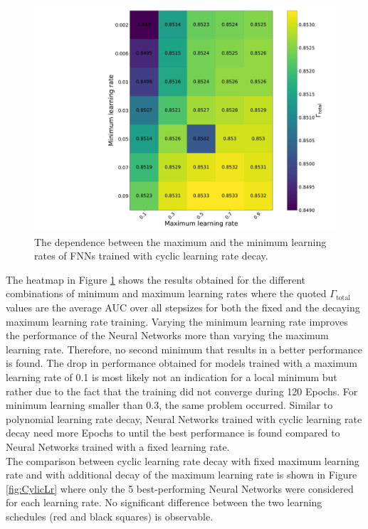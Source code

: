 \begin{figure}[H]
\centering
\includegraphics[width=\linewidth]{figs/FNN/Heat_MinMax}
\caption{The dependence between the maximum and the minimum learning rates of FNNs trained with cyclic learning rate decay.}
\label{fig:CylicHeatLr}
\end{figure}

\vspace{-0.1cm}

The heatmap in Figure \ref{fig:CylicHeatLr} shows the results obtained for the different combinations of minimum and maximum learning rates where the quoted $\Gamma_{\text{total}}$ values are the average AUC over all stepsizes for both the fixed and the decaying maximum learning rate training. Varying the minimum learning rate improves the performance of the Neural Networks more than varying the maximum learning rate. Therefore, no second minimum that results in a better performance is found. The drop in performance obtained for models trained with a maximum learning rate of 0.1 is most likely not an indication for a local minimum but rather due to the fact that the training did not converge during 120 Epochs. For minimum learning smaller than 0.3, the same problem occurred.  Similar to polynomial learning rate decay, Neural Networks trained with cyclic learning rate decay need more Epochs to until the best performance is found compared to Neural Networks trained with a fixed learning rate. \\
The comparison between cyclic learning rate decay with fixed maximum learning rate and with additional decay of the maximum learning rate is shown in Figure \ref{fig:CylicLr} where only the 5 best-performing Neural Networks were considered for each learning rate. No significant difference between the two learning schedules (red and black squares) is observable. \\

